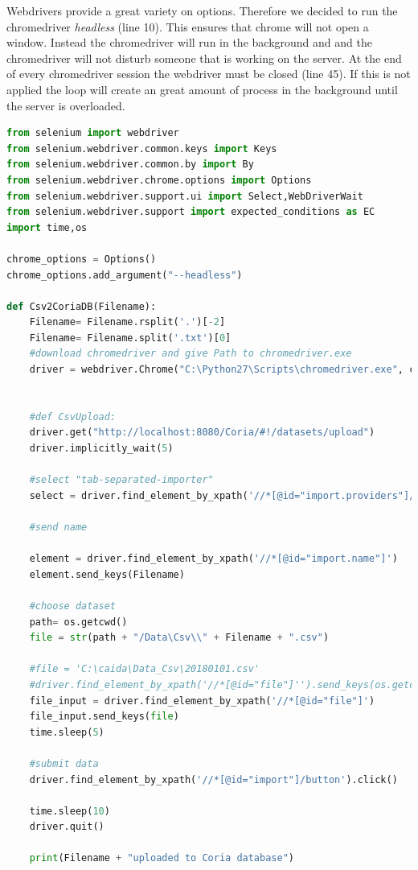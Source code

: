 \documentclass[conference, 11pt]{IEEEtran}
\begin{document}
Webdrivers provide a great variety on options. Therefore we decided to run the chromedriver \textit{headless} (line 10). This ensures that chrome will not open a window. Instead the chromedriver will run in the background and and the chromedriver will not disturb someone that is working on the server. At the end of every chromedriver session the webdriver must be closed (line 45). If this is not applied the loop will create an great amount of process in the background until the server is overloaded.


\begin{lstlisting}[float=*, language=Python,caption={A wide listing float, single column},captionpos=b]
from selenium import webdriver
from selenium.webdriver.common.keys import Keys
from selenium.webdriver.common.by import By
from selenium.webdriver.chrome.options import Options
from selenium.webdriver.support.ui import Select,WebDriverWait
from selenium.webdriver.support import expected_conditions as EC
import time,os

chrome_options = Options()  
chrome_options.add_argument("--headless")  

def Csv2CoriaDB(Filename):
	Filename= Filename.rsplit('.')[-2]
	Filename= Filename.split('.txt')[0]
	#download chromedriver and give Path to chromedriver.exe
	driver = webdriver.Chrome("C:\Python27\Scripts\chromedriver.exe", chrome_options=chrome_options)


	#def CsvUpload:
	driver.get("http://localhost:8080/Coria/#!/datasets/upload")
	driver.implicitly_wait(5)

	#select "tab-separated-importer"
	select = driver.find_element_by_xpath('//*[@id="import.providers"]/option[6]').click()

	#send name
	
	element = driver.find_element_by_xpath('//*[@id="import.name"]')
	element.send_keys(Filename)

	#choose dataset
	path= os.getcwd()
	file = str(path + "/Data\Csv\\" + Filename + ".csv")

	#file = 'C:\caida\Data_Csv\20180101.csv'
	#driver.find_element_by_xpath('//*[@id="file"]'').send_keys(os.getcwd("C:\Users\Carlimero\Downloads\datastructrue.txt")')
	file_input = driver.find_element_by_xpath('//*[@id="file"]')
	file_input.send_keys(file)
	time.sleep(5)

	#submit data
	driver.find_element_by_xpath('//*[@id="import"]/button').click()

	time.sleep(10)
	driver.quit()

	print(Filename + "uploaded to Coria database")
\end{lstlisting}
\end{document}
